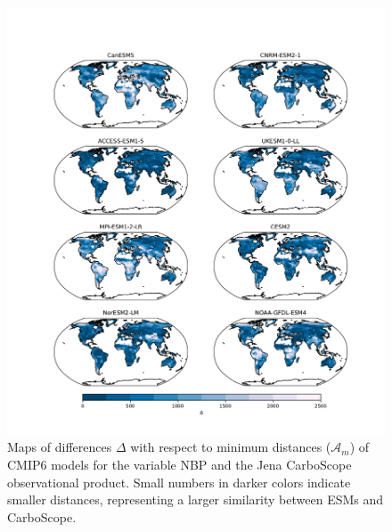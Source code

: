 \documentclass[gmd, manuscript]{copernicus}
\begin{document}
\begin{figure}[htbp]
   \centering
   \includegraphics[width=16cm]{Figures/CMIP6_CarboScope_D.pdf} %
   \caption{Maps of differences $\Delta$ with respect to minimum distances ($\mathcal{A}_m$) of CMIP6 models for the variable NBP and the Jena CarboScope observational product. Small numbers in darker colors indicate smaller distances, representing a larger similarity between ESMs and CarboScope.}
   \label{fig:Delta_NBP}
\end{figure}



\noappendix       %

\end{document}
